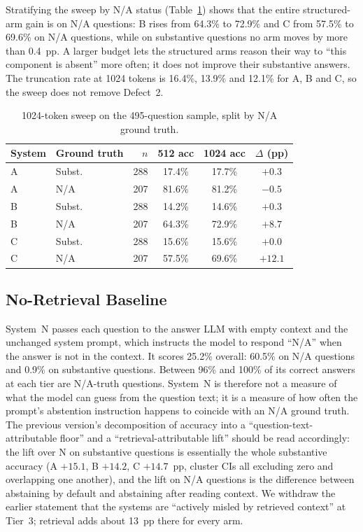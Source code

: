 Stratifying the sweep by N/A status (Table~\ref{tab:budget_sweep_na}) shows that the
entire structured-arm gain is on N/A questions: B rises from 64.3\% to 72.9\% and C from
57.5\% to 69.6\% on N/A questions, while on substantive questions no arm moves by more
than 0.4~pp.  A larger budget lets the structured arms reason their way to ``this
component is absent'' more often; it does not improve their substantive answers.
The truncation rate at 1024 tokens is 16.4\%, 13.9\% and 12.1\% for A, B and C, so the
sweep does not remove Defect~2.

\begin{table}[htbp]
\centering
\caption{1024-token sweep on the 495-question sample, split by N/A ground truth.}
\label{tab:budget_sweep_na}
\begin{tabular}{llrccc}
\toprule
System & Ground truth & $n$ & 512 acc & 1024 acc & $\Delta$ (pp) \\
\midrule
A & Subst. & 288 & 17.4\% & 17.7\% & $+0.3$ \\
A & N/A    & 207 & 81.6\% & 81.2\% & $-0.5$ \\
B & Subst. & 288 & 14.2\% & 14.6\% & $+0.3$ \\
B & N/A    & 207 & 64.3\% & 72.9\% & $+8.7$ \\
C & Subst. & 288 & 15.6\% & 15.6\% & $+0.0$ \\
C & N/A    & 207 & 57.5\% & 69.6\% & $+12.1$ \\
\bottomrule
\end{tabular}
\end{table}

\subsection{No-Retrieval Baseline}
\label{sec:results:noretrieval}

System~N passes each question to the answer LLM with empty context and the unchanged
system prompt, which instructs the model to respond ``N/A'' when the answer is not in the
context.  It scores 25.2\% overall: 60.5\% on N/A questions and 0.9\% on substantive
questions.  Between 96\% and 100\% of its correct answers at each tier are N/A-truth
questions.  System~N is therefore not a measure of what the model can guess from the
question text; it is a measure of how often the prompt's abstention instruction happens
to coincide with an N/A ground truth.  The previous version's decomposition of accuracy
into a ``question-text-attributable floor'' and a ``retrieval-attributable lift'' should
be read accordingly: the lift over N on substantive questions is essentially the whole
substantive accuracy (A $+15.1$, B $+14.2$, C $+14.7$~pp, cluster CIs all excluding
zero and overlapping one another), and the lift on N/A questions is the difference
between abstaining by default and abstaining after reading context.  We withdraw the
earlier statement that the systems are ``actively misled by retrieved context'' at
Tier~3; retrieval adds about 13~pp there for every arm.

